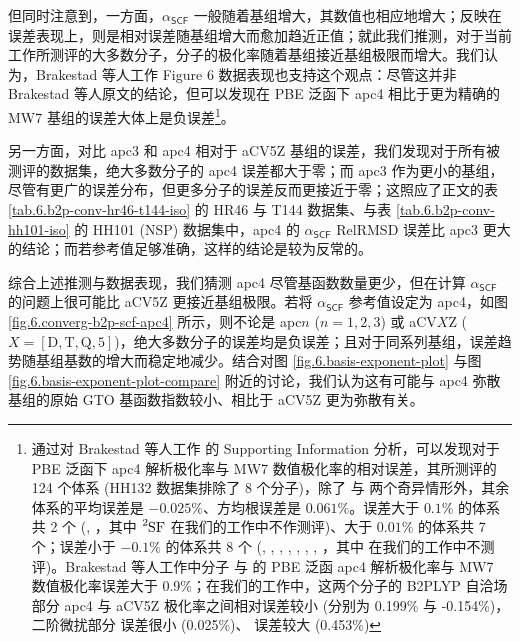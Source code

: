 但同时注意到，一方面，$\alpha_\textsf{SCF}$ 一般随着基组增大，其数值也相应地增大；反映在误差表现上，则是相对误差随基组增大而愈加趋近正值；就此我们推测，对于当前工作所测评的大多数分子，分子的极化率随着基组接近基组极限而增大。我们认为，Brakestad 等人工作\cite{Brakestad-Frediani.JCTC.2020} Figure 6 数据表现也支持这个观点：尽管这并非 Brakestad 等人原文的结论，但可以发现在 PBE 泛函下 apc4 相比于更为精确的 MW7 基组的误差大体上是负误差\footnote{通过对 Brakestad 等人工作\cite{Brakestad-Frediani.JCTC.2020} 的 Supporting Information 分析，可以发现对于 PBE 泛函下 apc4 解析极化率与 MW7 数值极化率的相对误差，其所测评的 124 个体系 (HH132 数据集排除了 8 个分子)，除了  与  两个奇异情形外，其余体系的平均误差是 $-0.025\%$、方均根误差是 $0.061\%$。误差大于 $0.1\%$ 的体系共 2 个 (, ，其中 $\ce{^2SF}$ 在我们的工作中不作测评)、大于 $0.01\%$ 的体系共 7 个；误差小于 $-0.1\%$ 的体系共 8 个 (, , , , , , , ，其中  在我们的工作中不测评)。Brakestad 等人工作中分子  与  的 PBE 泛函 apc4 解析极化率与 MW7 数值极化率误差大于 0.9\%；在我们的工作中，这两个分子的 B2PLYP 自洽场部分 apc4 与 aCV5Z 极化率之间相对误差较小 (分别为 0.199\% 与 -0.154\%)，二阶微扰部分  误差很小 (0.025\%)、 误差较大 (0.453\%)}。

另一方面，对比 apc3 和 apc4 相对于 aCV5Z 基组的误差，我们发现对于所有被测评的数据集，绝大多数分子的 apc4 误差都大于零；而 apc3 作为更小的基组，尽管有更广的误差分布，但更多分子的误差反而更接近于零；这照应了正文的表 \ref{tab.6.b2p-conv-hr46-t144-iso} 的 HR46 与 T144 数据集、与表 \ref{tab.6.b2p-conv-hh101-iso} 的 HH101 (NSP) 数据集中，apc4 的 $\alpha_\textsf{SCF}$ RelRMSD 误差比 apc3 更大的结论；而若参考值足够准确，这样的结论是较为反常的。

综合上述推测与数据表现，我们猜测 apc4 尽管基函数数量更少，但在计算 $\alpha_\textsf{SCF}$ 的问题上很可能比 aCV5Z 更接近基组极限。若将 $\alpha_\textsf{SCF}$ 参考值设定为 apc4，如图 \ref{fig.6.converg-b2p-scf-apc4} 所示，则不论是 apc$n$ ($n=1,2,3$) 或 aCV$X$Z ($X = \mathrm{[D,T,Q,5]}$)，绝大多数分子的误差均是负误差；且对于同系列基组，误差趋势随基组基数的增大而稳定地减少。结合对图 \ref{fig.6.basis-exponent-plot} 与图 \ref{fig.6.basis-exponent-plot-compare} 附近的讨论，我们认为这有可能与 apc4 弥散基组的原始 GTO 基函数指数较小、相比于 aCV5Z 更为弥散有关。

